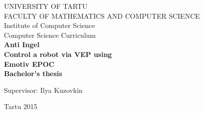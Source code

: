 
\begin{center}
\thispagestyle{empty}
\large{UNIVERSITY OF TARTU}\\
\large{FACULTY OF MATHEMATICS AND COMPUTER SCIENCE}\\
\large{Institute of Computer Science}\\
\large{Computer Science Curriculum}\\
\vspace{160pt}
\Large{\bf Anti Ingel}\\
\vspace{6pt}
\LARGE{\textbf{Control a robot via VEP using \\Emotiv EPOC}}\\
\vspace{12pt}
\large{\bf Bachelor's thesis}
\vspace{63pt}
\end{center}
\hfill \Large{Supervisor: Ilya Kuzovkin}
\vfill
\begin{center}
\normalsize{Tartu 2015}
\end{center}
